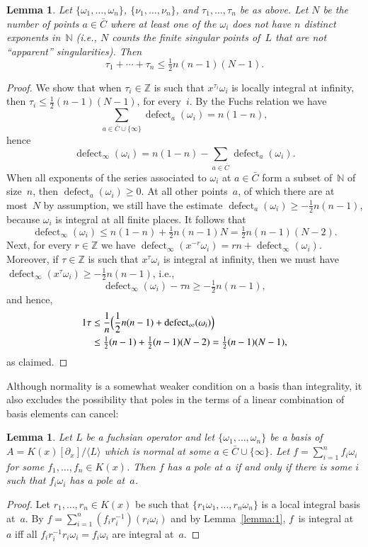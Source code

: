 \documentclass[final,1p,times,authoryear]{elsarticle}
\newtheorem{lemma}[theorem]{Lemma}
\def\<#1>{\langle#1\rangle}
\def\defect{\operatorname{defect}}
\let\set\mathbb
\begin{document}
\begin{lemma}\label{lemma:bound-exps}
  Let $\{\omega_1,\dots,\omega_n\}$, $\{\nu_1,\dots,\nu_n\}$, and $\tau_1,\dots,\tau_n$ be as above.
  Let $N$ be the number of points $a\in\bar C$ where at least one of the $\omega_i$ does not have
  $n$ distinct exponents in~$\set N$ (i.e., $N$ counts the
  finite singular points of~$L$ that are not ``apparent'' singularities).
  Then
  \[
    \tau_1+\cdots+\tau_n \leq \tfrac12 n(n-1)(N-1).
  \]
\end{lemma}
\begin{proof}
  We show that when $\tau_i\in\set Z$ is such that $x^{\tau_i}\omega_i$ is locally integral at infinity,
  then $\tau_i\leq \frac12 (n-1)(N-1)$, for every~$i$.
  By the Fuchs relation we have
  \[
    \sum_{a\in\bar C\cup\{\infty\}}\defect_a(\omega_i) = n(1-n),
  \]
  hence
  \[
    \defect_\infty(\omega_i) = n(1-n) - \sum_{a\in\bar C}\defect_a(\omega_i).
  \]
  When all exponents of the series associated to $\omega_i$ at $a\in\bar C$ form a subset of~$\set N$ of size~$n$, then
  $\defect_a(\omega_i)\geq0$. At all other points~$a$, of which there are at most~$N$ by assumption,
  we still have the estimate $\defect_a(\omega_i)\geq-\frac12n(n-1)$, because $\omega_i$ is integral at all finite places.
  It follows that
  \[
    \defect_\infty(\omega_i)\leq n(1-n) + \tfrac12 n(n-1) N = \tfrac12 n(n-1)(N-2).
  \]
  Next, for every $r\in\set Z$ we have $\defect_\infty(x^{-r}\omega_i) = rn+\defect_\infty(\omega_i)$.
  Moreover, if $\tau\in\set Z$ is such that $x^{\tau}\omega_i$ is integral at infinity, then we must have
  $\defect_\infty(x^{\tau}\omega_i)\geq -\frac12n(n-1)$, i.e.,
  \[
    \defect_\infty(\omega_i) - \tau n \geq -\tfrac12n(n-1),
  \]
  and hence,
  \begin{alignat*}1
    \tau &\leq \frac1n\Bigl( \frac12n(n-1) + \defect_\infty(\omega_i) \Bigr) \\
      &\leq \tfrac12 (n-1) + \tfrac12 (n-1)(N-2) = \tfrac12 (n-1)(N-1),
  \end{alignat*}
  as claimed.
\end{proof}

Although normality is a somewhat weaker condition on a basis than integrality,
it also excludes the possibility that poles in the terms of a linear combination
of basis elements can cancel:

\begin{lemma}\label{lemma:3}
  Let $L$ be a fuchsian operator and let $\{\omega_1,\dots,\omega_n\}$ be a basis of $A=K(x)[\partial_x]/\<L>$
  which is normal at some $a\in\bar C\cup\{\infty\}$.
  Let $f=\sum_{i=1}^n f_i\omega_i$ for some $f_1,\dots,f_n\in K(x)$.
  Then $f$ has a pole at $a$ if and only if
  there is some $i$ such that $f_i\omega_i$ has a pole at~$a$.
\end{lemma}
\begin{proof}
  Let $r_1,\dots,r_n\in K(x)$ be such that $\{r_1\omega_1,\dots,r_n\omega_n\}$ is a
  local integral basis at~$a$. By $f=\sum_{i=1}^n
  (f_ir_i^{-1})(r_i\omega_i)$ and by Lemma~\ref{lemma:1}, $f$~is integral at~$a$ iff all
  $f_ir_i^{-1}r_i\omega_i=f_i\omega_i$ are integral at~$a$.
\end{proof}
\end{document}
